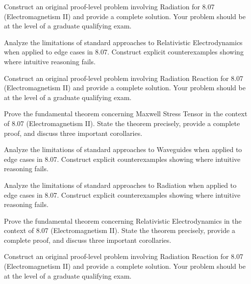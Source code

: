 \documentclass[12pt,a4paper]{exam}
\begin{document}
\begin{questions}

\question[2]
Construct an original proof-level problem involving Radiation for 8.07 (Electromagnetism II) and provide a complete solution. Your problem should be at the level of a graduate qualifying exam.

\vspace{0.3cm}

\question[4]
Analyze the limitations of standard approaches to Relativistic Electrodynamics when applied to edge cases in 8.07. Construct explicit counterexamples showing where intuitive reasoning fails.

\vspace{0.3cm}

\question[2]
Construct an original proof-level problem involving Radiation Reaction for 8.07 (Electromagnetism II) and provide a complete solution. Your problem should be at the level of a graduate qualifying exam.

\vspace{0.3cm}

\question[4]
Prove the fundamental theorem concerning Maxwell Stress Tensor in the context of 8.07 (Electromagnetism II). State the theorem precisely, provide a complete proof, and discuss three important corollaries.

\vspace{0.3cm}

\question[2]
Analyze the limitations of standard approaches to Waveguides when applied to edge cases in 8.07. Construct explicit counterexamples showing where intuitive reasoning fails.

\vspace{0.3cm}

\question[5]
Analyze the limitations of standard approaches to Radiation when applied to edge cases in 8.07. Construct explicit counterexamples showing where intuitive reasoning fails.

\vspace{0.3cm}

\question[4]
Prove the fundamental theorem concerning Relativistic Electrodynamics in the context of 8.07 (Electromagnetism II). State the theorem precisely, provide a complete proof, and discuss three important corollaries.

\vspace{0.3cm}

\question[4]
Construct an original proof-level problem involving Radiation Reaction for 8.07 (Electromagnetism II) and provide a complete solution. Your problem should be at the level of a graduate qualifying exam.


\end{questions}
\end{document}
